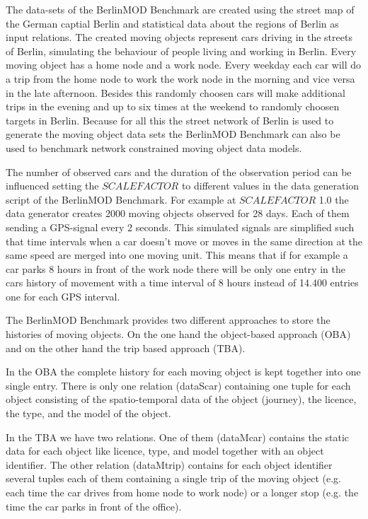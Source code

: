 \documentclass[a4paper]{article}
\newcommand{\bmodb} {BerlinMOD Benchmark}
\begin{document}
The data-sets of the \bmodb{} are created using the street map of the German
captial Berlin \cite{bbike} and statistical data about the regions of Berlin
\cite{bevberlin,berlinstadtatlas} as input relations.
The created moving objects represent cars driving in the streets of Berlin,
simulating the behaviour of people living and working in Berlin.
Every moving object has a home node and a work node. Every weekday each car will
do a trip from the home node to work the work node in the morning and vice versa
in the late afternoon. Besides this randomly choosen cars will make additional
trips in the evening and up to six times at the weekend to randomly choosen
targets in Berlin. Because for all this the street network of Berlin is used to
generate the moving object data sets the \bmodb{} can also be used to benchmark
network constrained moving object data models.

The number of observed cars and the duration of the observation period can be
influenced setting the $SCALEFACTOR$ to different values in the data generation
script of the \bmodb{}. For example at $SCALEFACTOR$ 1.0 the data generator
creates 2000 moving objects observed for 28 days. Each of them sending a
GPS-signal every 2 seconds. This simulated signals are simplified such that time
intervals when a car doesn't move or moves in the same direction at the same
speed are merged into one moving unit. This means that if for example a car parks
8 hours in front of the work node there will be only one entry in the cars history of movement with a time interval of 8 hours instead of 14.400 entries one for each
GPS interval.

The \bmodb{} provides two different approaches to store the histories of moving
objects. On the one hand the object-based approach (OBA) and on the other hand
the trip based approach (TBA).

In the OBA the complete history for each moving object
is kept together into one single entry. There is only one relation (dataScar)
containing one tuple for each object consisting of the spatio-temporal data of
the object (journey), the licence, the type, and the model of the object.

In the TBA we have two relations. One of them (dataMcar) contains the static data
for each object like licence, type, and model together with an object identifier.
The other relation (dataMtrip) contains for each object identifier several tuples
each of them containing a single trip of the moving object (e.g. each time the car
drives from home node to work node) or a longer stop (e.g. the time the car parks
in front of the office).
\end{document}
